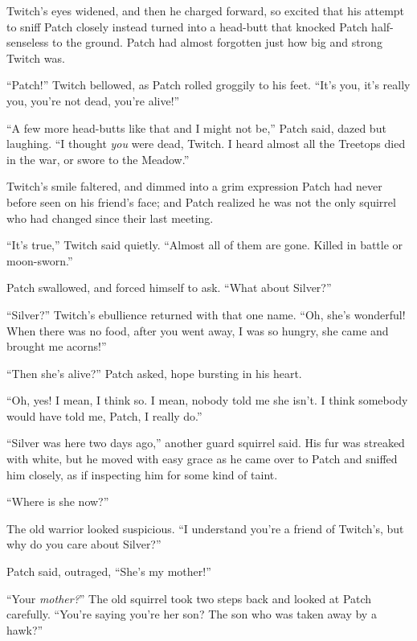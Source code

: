\documentclass[ebook,oneside,openany,17pt]{memoir}
\newenvironment{tolerant}[1]{%
  \par\tolerance=#1\relax
}{%
  \par
}
\begin{document}
\begin{tolerant}{1000}
Twitch’s eyes widened, and then he charged forward, so excited that
his attempt to sniff Patch close\-ly instead turned into a head-butt
that knocked Patch half-senseless to the ground. Patch had almost
forgotten just how big and strong Twitch was.
\end{tolerant}

“Patch!” Twitch bellowed, as Patch rolled groggily to his feet. “It’s
you, it’s really you, you’re not dead, you’re alive!”

“A few more head-butts like that and I might not be,” Patch said,
dazed but laughing. “I thought \emph{you} were dead, Twitch. I heard
almost all the Treetops died in the war, or swore to the Meadow.”

\begin{tolerant}{5000}
Twitch’s smile faltered, and dimmed into a grim expression Patch had
never before seen on his friend’s face; and Patch realized he was not
the only squirrel who had changed since their last meeting.
\end{tolerant}

“It’s true,” Twitch said quietly. “Almost all of them are gone. Killed
in battle or moon-sworn.”

\begin{tolerant}{2000}
Patch swallowed, and forced himself to ask. “What about Silver?”
\end{tolerant}

“Silver?” Twitch’s ebullience returned with that one name. “Oh, she’s
wonderful! When there was no food, after you went away, I was so
hungry, she came and brought me acorns!”

“Then she’s alive?” Patch asked, hope bursting in his heart.

“Oh, yes! I mean, I think so. I mean, nobody told me she isn’t. I
think somebody would have told me, Patch, I really do.”

“Silver was here two days ago,” another guard squirrel said. His fur
was streaked with white, but he moved with easy grace as he came over
to Patch and sniffed him closely, as if inspecting him for some kind
of taint.

“Where is she now?”

The old warrior looked suspicious. “I understand you’re a friend of
Twitch’s, but why do you care about Silver?”

Patch said, outraged, “She’s my mother!”

“Your \emph{mother?}” The old squirrel took two steps back and
looked at Patch carefully. “You’re saying you’re her son? The son who
was taken away by a hawk?”
\end{document}
